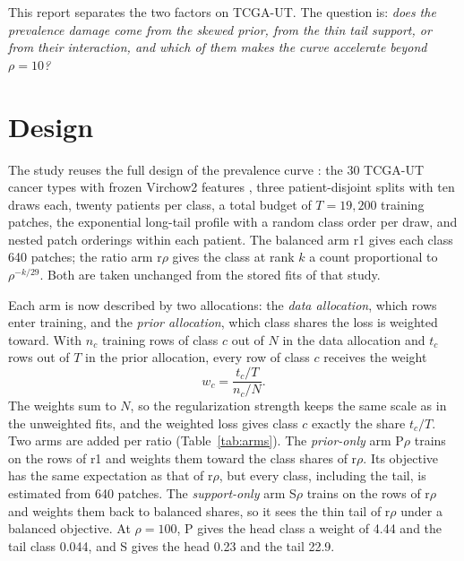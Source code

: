 \documentclass[11pt]{article}
\begin{document}
This report separates the two factors on TCGA-UT. The question is: \emph{does the prevalence damage come from the skewed prior, from the thin tail support, or from their interaction, and which of them makes the curve accelerate beyond $\rho=10$?}

\section{Design}
\label{sec:design}
The study reuses the full design of the prevalence curve \citep{queisler2026prevalenceTcga}: the 30 TCGA-UT cancer types with frozen Virchow2 features \citep{zimmermann2024virchow2}, three patient-disjoint splits with ten draws each, twenty patients per class, a total budget of $T=19{,}200$ training patches, the exponential long-tail profile with a random class order per draw, and nested patch orderings within each patient. The balanced arm r1 gives each class 640 patches; the ratio arm r$\rho$ gives the class at rank $k$ a count proportional to $\rho^{-k/29}$. Both are taken unchanged from the stored fits of that study.

Each arm is now described by two allocations: the \emph{data allocation}, which rows enter training, and the \emph{prior allocation}, which class shares the loss is weighted toward. With $n_c$ training rows of class $c$ out of $N$ in the data allocation and $t_c$ rows out of $T$ in the prior allocation, every row of class $c$ receives the weight
\begin{equation}
  w_c = \frac{t_c/T}{n_c/N}.
  \label{eq:weights}
\end{equation}
\noindent The weights sum to $N$, so the regularization strength keeps the same scale as in the unweighted fits, and the weighted loss gives class $c$ exactly the share $t_c/T$. Two arms are added per ratio (Table~\ref{tab:arms}). The \emph{prior-only} arm P$\rho$ trains on the rows of r1 and weights them toward the class shares of r$\rho$. Its objective has the same expectation as that of r$\rho$, but every class, including the tail, is estimated from 640 patches. The \emph{support-only} arm S$\rho$ trains on the rows of r$\rho$ and weights them back to balanced shares, so it sees the thin tail of r$\rho$ under a balanced objective. At $\rho=100$, P gives the head class a weight of 4.44 and the tail class 0.044, and S gives the head 0.23 and the tail 22.9.
\end{document}
